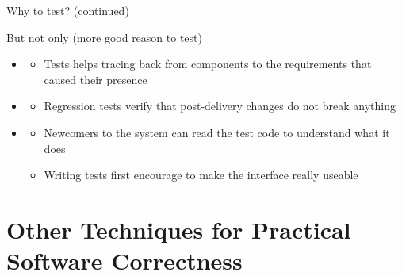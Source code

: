 \begin{frame}[fragile]{Why to test? (continued)}
  \bigskip

  \begin{block}{But not only (more good reason to test)}
    \begin{itemize}
    \item {}
      \begin{itemize}
      \item Tests helps tracing back from components to the requirements that
        caused their presence
      \end{itemize}
    \item {}
      \begin{itemize}
      \item Regression tests verify that post-delivery changes do not break
        anything
      \end{itemize}
    \item {}
      \begin{itemize}
      \item Newcomers to the system can read the test code to understand what
        it does
      \item Writing tests first encourage to make the interface really useable
      \end{itemize}
    \end{itemize}
  \end{block}
\end{frame}
\section{Other Techniques for Practical Software Correctness}\sectionpage
